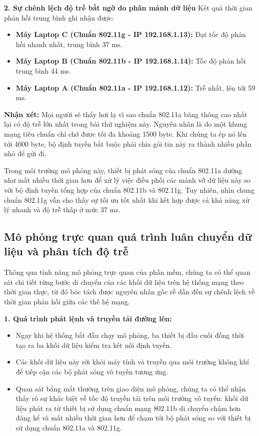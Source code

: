 \documentclass[a4paper, 12pt]{article}
\begin{document}
\textbf{2. Sự chênh lệch độ trễ bất ngờ do phân mảnh dữ liệu}
Kết quả thời gian phản hồi trung bình ghi nhận được:
\begin{itemize}
    \item \textbf{Máy Laptop C (Chuẩn 802.11g - IP 192.168.1.13):} Đạt tốc độ phản hồi nhanh nhất, trung bình 37 ms.
    \item \textbf{Máy Laptop B (Chuẩn 802.11b - IP 192.168.1.14):} Tốc độ phản hồi trung bình 44 ms.
    \item \textbf{Máy Laptop A (Chuẩn 802.11a - IP 192.168.1.12):} Trễ nhất, lên tới 59 ms.
\end{itemize}

\textbf{Nhận xét:} 
Mọi người sẽ thấy hơi lạ vì sao chuẩn 802.11a băng thông cao nhất lại có độ trễ lớn nhất trong bài thử nghiệm này. Nguyên nhân là do một khung mạng tiêu chuẩn chỉ chở được tối đa khoảng 1500 byte. Khi chúng ta ép nó lên tới 4000 byte, bộ định tuyến bắt buộc phải chia gói tin này ra thành nhiều phần nhỏ để gửi đi. 

Trong môi trường mô phỏng này, thiết bị phát sóng của chuẩn 802.11a dường như mất nhiều thời gian hơn để xử lý việc điều phối các mảnh vỡ dữ liệu này so với bộ định tuyến tổng hợp của chuẩn 802.11b và 802.11g. Tuy nhiên, nhìn chung chuẩn 802.11g vẫn cho thấy sự tối ưu tốt nhất khi kết hợp được cả khả năng xử lý nhanh và độ trễ thấp ở mức 37 ms.

\subsection{Mô phỏng trực quan quá trình luân chuyển dữ liệu và phân tích độ trễ}
Thông qua tính năng mô phỏng trực quan của phần mềm, chúng ta có thể quan sát chi tiết từng bước di chuyển của các khối dữ liệu trên hệ thống mạng theo thời gian thực, từ đó bóc tách được nguyên nhân gốc rễ dẫn đến sự chênh lệch về thời gian phản hồi giữa các thế hệ mạng.

\textbf{1. Quá trình phát lệnh và truyền tải đường lên:}
\begin{itemize}
    \item Ngay khi hệ thống bắt đầu chạy mô phỏng, ba thiết bị đầu cuối đồng thời tạo ra ba khối dữ liệu kiểm tra kết nối định tuyến.
    \item Các khối dữ liệu này rời khỏi máy tính và truyền qua môi trường không khí để tiếp cận các bộ phát sóng vô tuyến tương ứng.
    \item Quan sát bằng mắt thường trên giao diện mô phỏng, chúng ta có thể nhận thấy rõ sự khác biệt về tốc độ truyền tải trên môi trường vô tuyến: khối dữ liệu phát ra từ thiết bị sử dụng chuẩn mạng 802.11b di chuyển chậm hơn đáng kể và mất nhiều thời gian hơn để chạm tới bộ phát sóng so với thiết bị sử dụng chuẩn 802.11a và 802.11g.
\end{itemize}
\end{document}
